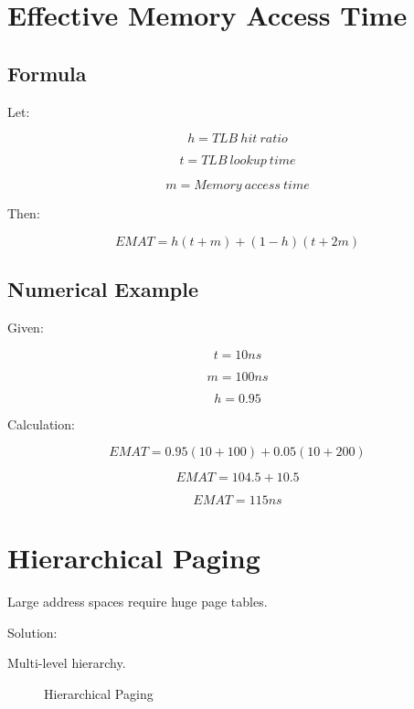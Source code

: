 \section{Effective Memory Access Time}

\subsection{Formula}

Let:

\[
h = TLB\ hit\ ratio
\]

\[
t = TLB\ lookup\ time
\]

\[
m = Memory\ access\ time
\]

Then:

\[
EMAT = h(t+m)+(1-h)(t+2m)
\]

\subsection{Numerical Example}

Given:

\[
t=10ns
\]

\[
m=100ns
\]

\[
h=0.95
\]

Calculation:

\[
EMAT =
0.95(10+100)+0.05(10+200)
\]

\[
EMAT =
104.5+10.5
\]

\[
EMAT = 115ns
\]

\section{Hierarchical Paging}

Large address spaces require huge page tables.

Solution:

Multi-level hierarchy.

\begin{figure}[H]
\centering
{}
\caption{Hierarchical Paging}
\end{figure}

